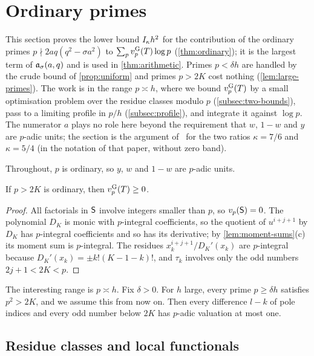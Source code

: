 \section{Ordinary primes}\label{sec:ordinary}

This section proves the lower bound $I_\kappa h^2$ for the contribution of the ordinary
primes $p\nmid2aq(q^2-\sigma a^2)$ to $\sum_pv_{p}^{\mathrm{G}}(T)\log p$ (\cref{thm:ordinary}); it is the
largest term of $\mathfrak{a}_\sigma(a,q)$ and is used in \cref{thm:arithmetic}. Primes $p<\delta h$
are handled by the crude bound of \cref{prop:uniform} and primes $p>2K$ cost nothing
(\cref{lem:large-primes}). The work is in the range $p\asymp h$, where we bound $v_{p}^{\mathrm{G}}(T)$ by a
small optimisation problem over the residue classes modulo $p$ (\cref{subsec:two-bounds}), pass to
a limiting profile in $p/h$ (\cref{subsec:profile}), and integrate it against $\log p$. The numerator
$a$ plays no role here beyond the requirement that $w$, $1-w$ and $y$ are $p$-adic units; the
section is the argument of~\cite{AxiomForge2026numeratorTwo} for the two ratios $\kappa=7/6$ and
$\kappa=5/4$ (in the notation of that paper, without zero band).

Throughout, $p$ is ordinary, so $y$, $w$ and $1-w$ are $p$-adic units.

\begin{lemma}\label{lem:large-primes}
If $p>2K$ is ordinary, then $v_{p}^{\mathrm{G}}(T)\ge0$.
\end{lemma}

\begin{proof}
All factorials in $\mathsf{S}$ involve integers smaller than $p$, so $v_p(\mathsf{S})=0$. The polynomial
$D_K$ is monic with $p$-integral coefficients, so the quotient of $u^{i+j+1}$ by $D_K$ has
$p$-integral coefficients and so has its derivative; by \cref{lem:moment-sums}(c) its moment sum
is $p$-integral. The residues $x_k^{i+j+1}/D_K'(x_k)$ are $p$-integral because
$D_K'(x_k)=\pm k!(K-1-k)!$, and $\tau_k$ involves only the odd numbers $2j+1<2K<p$.
\end{proof}

The interesting range is $p\asymp h$. Fix $\delta>0$. For $h$ large, every prime
$p\ge\delta h$ satisfies $p^2>2K$, and we assume this from now on. Then every difference
$l-k$ of pole indices and every odd number below $2K$ has $p$-adic valuation at most one.

\subsection{Residue classes and local functionals}\label{subsec:distribution}

